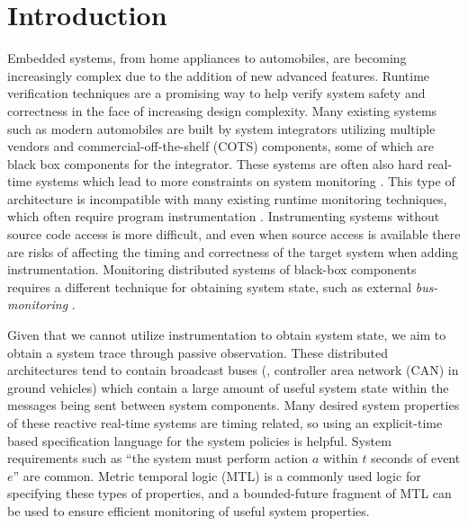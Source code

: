 
\section{Introduction}
Embedded systems, from home appliances to automobiles, are becoming increasingly complex due to the addition of new advanced features. 
Runtime verification techniques are a promising way to help verify system safety and correctness in the face of increasing design complexity.
Many existing systems such as modern automobiles are built by system integrators utilizing multiple vendors and commercial-off-the-shelf (COTS) components, some of which are black box components for the integrator. 
These systems are often also hard real-time systems which lead to more constraints on system monitoring \cite{Goodloe2010}.
%
This type of architecture is incompatible with many existing runtime monitoring techniques, which often require program instrumentation \cite{}. 
Instrumenting systems without source code access is more difficult, and even when source access is available there are risks of affecting the timing and correctness of the target system when adding instrumentation.
Monitoring distributed systems of black-box components requires a different technique for obtaining system state, such as external \emph{bus-monitoring} \cite{Goodloe2010}.

Given that we cannot utilize instrumentation to obtain system state, 
we aim to obtain a system trace through passive observation. 
These distributed architectures tend to contain broadcast buses (\eg, controller area network (CAN) in ground vehicles) which contain a large amount of useful system state within the messages being sent between system components. 
Many desired system properties of these reactive real-time systems are timing related, so using an explicit-time based specification language for the system policies is helpful. 
System requirements such as ``{the system must perform action $a$ within $t$ seconds of event $e$}'' are common.
Metric temporal logic (MTL) is a commonly used logic for specifying these types of properties, and a bounded-future fragment of MTL can be used to ensure efficient monitoring of useful system properties.

